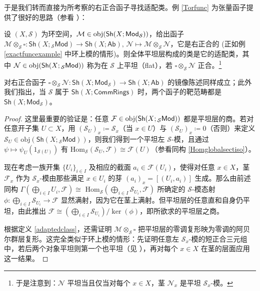 于是我们转而直接为所考察的右正合函子寻找适配类。例 \ref{Torfunc} 为张量函子提供了很好的思路（参看 \cite[Proposition III.8.5]{[GM03]}）：

\begin{Lem}\label{flatsareadapted}
设 $(X,\mathcal{S})$ 为环空间，$\mathcal{M}\in\textup{obj}(\mathsf{Sh}(X;\mathsf{Mod}_\mathcal{S}))$，给出函子 $\mathcal{M}\otimes_\mathcal{S}\square:\mathsf{Sh}(X;{}_\mathcal{S}\mathsf{Mod})\rightarrow \mathsf{Sh}(X;\mathsf{Ab}),\,\mathcal{N}\mapsto\mathcal{M}\otimes_\mathcal{S}\mathcal{N}$，它是右正合的 \textup(正如例 \ref{exactfuncexample} 中环上模的情形\textup)。则全体平坦层构成的类是它的适配类，其中 $\mathcal{N}\in\textup{obj}(\mathsf{Sh}(X;{}_\mathcal{S}\mathsf{Mod}))$ 称为在 $\mathcal{S}$ 上\textup{平坦}（\textup{flat}），若 $\square\otimes_\mathcal{S}\mathcal{N}$ 正合。\footnote{于是注意到：$\mathcal{N}$ 平坦当且仅当对每个 $x\in X$，茎 $\mathcal{N}_x$ 是平坦 $\mathcal{S}_x$-模。}

对右正合函子 $\square\otimes_\mathcal{S}\mathcal{N}:\mathsf{Sh}(X;\mathsf{Mod}_\mathcal{S})\rightarrow \mathsf{Sh}(X;\mathsf{Ab})$ 的镜像陈述同样成立；此外我们指出，当 $\mathcal{S}$ 属于 $\mathsf{Sh}(X;\mathsf{CommRings})$ 时，两个函子的靶范畴都是 $\mathsf{Sh}(X;\mathsf{Mod}_\mathcal{S})$。
\end{Lem}

\begin{proof}
这里最重要的验证是：任意 $\mathcal{F}\in\textup{obj}(\mathsf{Sh}(X;{}_\mathcal{S}\mathsf{Mod}))$ 都是平坦层的商。若对任意开子集 $U\subset X$，用 $(\mathcal{S}_U)_x\coloneqq\mathcal{S}_x$（当 $x\in U$）与 $(\mathcal{S}_U)_x\coloneqq 0$（否则）来定义 $\mathcal{S}_U\in\text{obj}(\mathsf{Sh}(X;{}_\mathcal{S}\mathsf{Mod}))$，则我们得到一个平坦左 $\mathcal{S}$-模，且通过 $\psi\mapsto\psi_U(1_{\mathcal{S}(U)})$ 有 $\text{Hom}_\mathcal{S}(\mathcal{S}_U,\mathcal{F})\cong \mathcal{F}(U)$（参看同构 \eqref{Homglobalsectiso}）。

现在考虑一族开集 $\{U_i\}_{i\in I}$ 及相应的截面 $a_i\in\mathcal{F}(U_i)$，使得对任意 $x\in X$，茎 $\mathcal{F}_x$ 作为 $\mathcal{S}_x$-模由那些满足 $x\in U_i$ 的芽 $(a_i)_x=[(U_i,a_i)]$ 生成。那么由前述同构 $\Gamma(\bigoplus_{i\in I}U_i,\mathcal{F})\cong$ $\text{Hom}_\mathcal{S}(\bigoplus_{i\in I}\mathcal{S}_{U_i},\mathcal{F})$ 所确定的 $\mathcal{S}$-模态射 $\phi:\bigoplus_{i\in I}\mathcal{S}_{U_i}\rightarrow\mathcal{F}$ 显然满射，因为它在茎上满射。但平坦层的任意直和自身仍平坦，由此推出 $\mathcal{F}\cong (\bigoplus_{i\in I}\mathcal{S}_{U_i})/\ker(\phi)$，即所欲求的平坦层之商。

根据定义 \ref{adaptedclass}，还需证明 $\mathcal{M}\otimes_\mathcal{S}\square$ 把平坦层的零调复形映为零调的阿贝尔群层复形。这完全类似于环上模的情形：先证明任意左 $\mathcal{S}_x$-模的短正合三元组中，若后两个对象平坦则第一个也平坦（见 \cite[Exercise III.7.5]{[GM03]}），再对每个 $x\in X$ 在茎的层面应用这一结果。
\end{proof}

